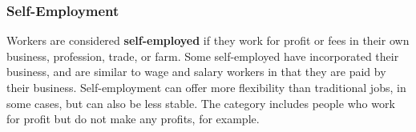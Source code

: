 \subsubsection*{Self-Employment}
\begin{minipage}{0.76\textwidth}
\small Workers are considered \textbf{self-employed} if they work for profit or fees in their own business, profession, trade, or farm. Some self-employed have incorporated their business, and are similar to wage and salary workers in that they are paid by their business. Self-employment can offer more flexibility than traditional jobs, in some cases, but can also be less stable. The category includes people who work for profit but do not make any profits, for example. 


\end{minipage}
\vspace{0.5mm}

\begin{minipage}[t]{0.44\textwidth}
\\
\end{minipage} \hspace{5mm}
\begin{minipage}[t]{0.28\textwidth}
\small 
\end{minipage}
\newpage


